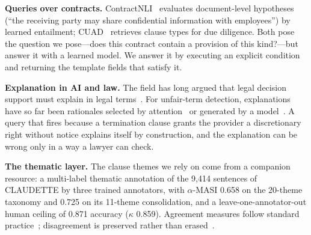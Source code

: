 \documentclass{IOS-Book-Article}
\newcommand{\corpus}{CLAUDETTE}
\begin{document}
\textbf{Queries over contracts.} ContractNLI~\cite{koreeda2021contractnli} evaluates document-level hypotheses (``the receiving party may share confidential information with employees'') by learned entailment; CUAD~\cite{hendrycks2021cuad} retrieves clause types for due diligence. Both pose the question we pose---does this contract contain a provision of this kind?---but answer it with a learned model. We answer it by executing an explicit condition and returning the template fields that satisfy it.

\textbf{Explanation in AI and law.} The field has long argued that legal decision support must explain in legal terms~\cite{atkinson2020explanation}. For unfair-term detection, explanations have so far been rationales selected by attention~\cite{ruggeri2022memory} or generated by a model~\cite{liepina2020claudettetool}. A query that fires because a termination clause grants the provider a discretionary right without notice explains itself by construction, and the explanation can be wrong only in a way a lawyer can check.

\textbf{The thematic layer.} The clause themes we rely on come from a companion resource: a multi-label thematic annotation of the 9,414 sentences of \corpus{} by three trained annotators, with $\alpha$-MASI 0.658 on the 20-theme taxonomy and 0.725 on its 11-theme consolidation, and a leave-one-annotator-out human ceiling of 0.871 accuracy ($\kappa$ 0.859). Agreement measures follow standard practice~\cite{krippendorff2018content,passonneau2006masi,artstein2008intercoder}; disagreement is preserved rather than erased~\cite{braun2024differ}.
\end{document}
